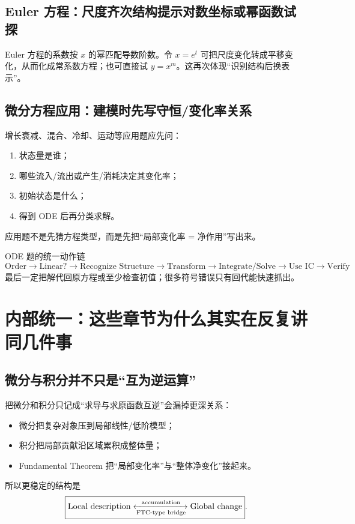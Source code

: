 \documentclass[11pt,a4paper,openany]{ctexbook}
\begin{document}
\section{Euler 方程：尺度齐次结构提示对数坐标或幂函数试探}
Euler 方程的系数按 $x$ 的幂匹配导数阶数。令 $x=e^t$ 可把尺度变化转成平移变化，从而化成常系数方程；也可直接试 $y=x^m$。这再次体现“识别结构后换表示”。

\section{微分方程应用：建模时先写守恒/变化率关系}
增长衰减、混合、冷却、运动等应用题应先问：
\begin{enumerate}
  \item 状态量是谁；
  \item 哪些流入/流出或产生/消耗决定其变化率；
  \item 初始状态是什么；
  \item 得到 ODE 后再分类求解。
\end{enumerate}
应用题不是先猜方程类型，而是先把“局部变化率 = 净作用”写出来。

\begin{examBox}{ODE 题的统一动作链}
\[
\boxed{\text{Order}\to\text{Linear?}\to\text{Recognize Structure}\to\text{Transform}\to\text{Integrate/Solve}\to\text{Use IC}\to\text{Verify}}
\]
最后一定把解代回原方程或至少检查初值；很多符号错误只有回代能快速抓出。
\end{examBox}

\chapter{内部统一：这些章节为什么其实在反复讲同几件事}

\section{微分与积分并不只是“互为逆运算”}
把微分和积分只记成“求导与求原函数互逆”会漏掉更深关系：
\begin{itemize}
  \item 微分把复杂对象压到局部线性/低阶模型；
  \item 积分把局部贡献沿区域累积成整体量；
  \item Fundamental Theorem 把“局部变化率”与“整体净变化”接起来。
\end{itemize}
所以更稳定的结构是
\[
\boxed{\text{Local description}\xleftrightarrow[\text{FTC-type bridge}]{\text{accumulation}}\text{Global change}}.
\]
\end{document}
